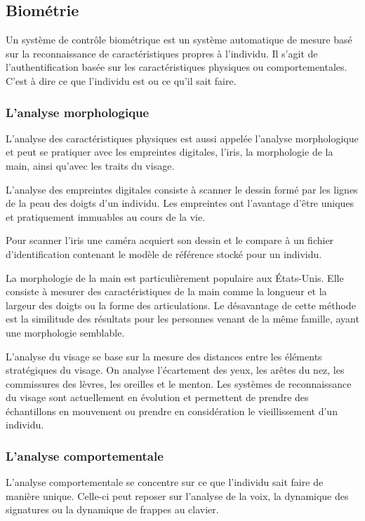 \subsection{Biométrie}

Un système de contrôle biométrique est un système automatique de mesure basé sur la reconnaissance de caractéristiques propres à l'individu. Il s'agit de l'authentification basée sur les caractéristiques physiques ou comportementales. C'est à dire ce que l'individu est ou ce qu'il sait faire.

\subsubsection{L'analyse morphologique}

L'analyse des caractéristiques physiques est aussi appelée l'analyse morphologique et peut se pratiquer avec les empreintes digitales, l'iris, la morphologie de la main, ainsi qu'avec les traits du visage.

L'analyse des empreintes digitales consiste à scanner le dessin formé par les lignes de la peau des doigts d'un individu. Les empreintes ont l'avantage d'être uniques et pratiquement immuables au cours de la vie.

Pour scanner l'iris une caméra acquiert son dessin et le compare à un fichier d'identification contenant le modèle de référence stocké pour un individu.

La morphologie de la main est particulièrement populaire aux États-Unis. Elle consiste à mesurer des caractéristiques de la main comme la longueur et la largeur des doigts ou la forme des articulations. Le désavantage de cette méthode est la similitude des résultats pour les personnes venant de la même famille, ayant une morphologie semblable.

L'analyse du visage se base sur la mesure des distances entre les éléments stratégiques du visage. On analyse l'écartement des yeux,  les arêtes du nez, les commissures des lèvres, les oreilles et le menton. Les systèmes de reconnaissance du visage sont actuellement en évolution et permettent de prendre des échantillons en mouvement ou prendre en considération le vieillissement d'un individu.


\subsubsection{L'analyse comportementale}

L'analyse comportementale se concentre sur ce que l'individu sait faire de manière unique. Celle-ci peut reposer sur l'analyse de la voix, la dynamique des signatures ou la dynamique de frappes au clavier.

